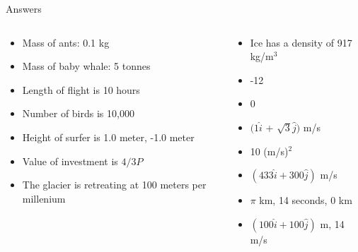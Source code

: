 \documentclass{beamer}
\begin{document}
\begin{frame}{Answers}
\begin{columns}[T]
\begin{column}{0.5\textwidth}
\begin{itemize}
\item Mass of ants: 0.1 kg
\item Mass of baby whale: 5 tonnes
\item Length of flight is 10 hours
\item Number of birds is 10,000
\item Height of surfer is 1.0 meter, -1.0 meter
\item Value of investment is $4/3 P$
\item The glacier is retreating at 100 meters per millenium
\end{itemize}
\end{column}
\begin{column}{0.5\textwidth}
\begin{itemize}
\item Ice has a density of 917 kg/m$^3$
\item -12
\item 0
\item $(1\hat{i}$ + $\sqrt{3}\hat{j})$  m/s
\item 10 (m/s)$^2$
\item $(433\hat{i}+300\hat{j})$ m/s
\item $\pi$ km, 14 seconds, $0$ km
\item $(100\hat{i} + 100\hat{j})$ m, 14 m/s
\end{itemize}
\end{column}
\end{columns}
\end{frame}
\end{document}
